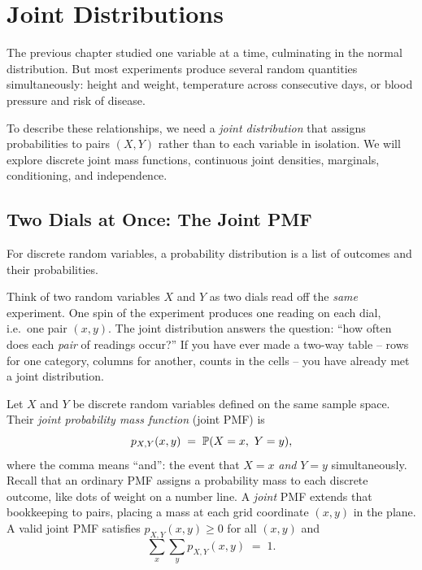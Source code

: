 \chapter{Joint Distributions}

The previous chapter studied one variable at a time, culminating in the normal
distribution. But most experiments produce several random quantities
simultaneously: height and weight, temperature across consecutive days, or blood
pressure and risk of disease.

To describe these relationships, we need a \emph{joint distribution} that
assigns probabilities to pairs $(X,Y)$ rather than to each variable in isolation.
We will explore discrete joint mass functions, continuous joint densities, marginals, conditioning, and independence.

\section{Two Dials at Once: The Joint PMF}
\label{ch13:joint-pmf}

For discrete random variables, a probability distribution is a list of outcomes and their probabilities.

\begin{intuitionbox}
Think of two random variables $X$ and $Y$ as two dials read off the \emph{same}
experiment. One spin of the experiment produces one reading on each dial, i.e.\
one pair $(x,y)$. The joint distribution answers the question:
``how often does each \emph{pair} of readings occur?'' If you have ever made a
two-way table -- rows for one category, columns for another, counts in the cells
-- you have already met a joint distribution.
\end{intuitionbox}

\begin{definition}
\label{ch13:def-joint-pmf}
Let $X$ and $Y$ be discrete random variables defined on the same sample space.
Their \emph{joint probability mass function} (joint PMF) is
\[
  p_{X,Y}(x,y) \;=\; \P(X = x,\ Y = y),
\]
where the comma means ``and'': the event that $X=x$ \emph{and} $Y=y$
simultaneously. Recall that an ordinary PMF assigns a probability mass to each
discrete outcome, like dots of weight on a number line. A \emph{joint} PMF
extends that bookkeeping to pairs, placing a mass at each grid coordinate $(x,y)$
in the plane.
A valid joint PMF satisfies $p_{X,Y}(x,y)\ge 0$ for all $(x,y)$ and
\[
  \sum_{x}\sum_{y} p_{X,Y}(x,y) \;=\; 1 .
\]
\end{definition}

